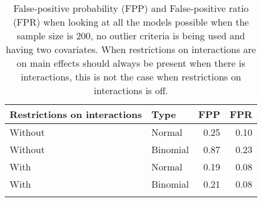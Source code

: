 \begin{longtable}{llrr}
\caption{False-positive probability (FPP) and False-positive ratio (FPR) when looking at all the models possible when the sample size is 200, no outlier criteria is being used and having two covariates. When restrictions on interactions are on main effects should always be present when there is interactions, this is not the case when restrictions on interactions is off.} \\ 
  \hline
Restrictions on interactions & Type & FPP & FPR \\ 
  \hline
Without & Normal & 0.25 & 0.10 \\ 
  Without & Binomial & 0.87 & 0.23 \\ 
  With & Normal & 0.19 & 0.08 \\ 
  With & Binomial & 0.21 & 0.08 \\ 
   \hline
\hline
\label{tab:resultFull}
\end{longtable}
